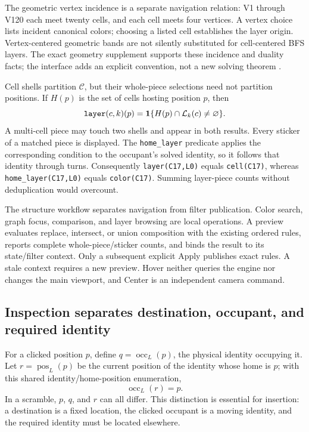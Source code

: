 \documentclass[a4paper,11pt]{article}
\begin{document}
The geometric vertex incidence is a separate navigation relation: V1 through V120 each meet twenty cells, and each cell meets four vertices. A vertex choice lists incident canonical colors; choosing a listed cell establishes the layer origin. Vertex-centered geometric bands are not silently substituted for cell-centered BFS layers. The exact geometry supplement supports these incidence and duality facts; the interface adds an explicit convention, not a new solving theorem \cite{puzzletheory,structure03}.

Cell shells partition \(\mathcal C\), but their whole-piece selections need not partition positions. If \(H(p)\) is the set of cells hosting position \(p\), then
\[
\texttt{layer}(c,k)(p)=
{\bf1}\{H(p)\cap\mathcal L_k(c)\ne\varnothing\}.
\]
A multi-cell piece may touch two shells and appear in both results. Every sticker of a matched piece is displayed. The \texttt{home\_layer} predicate applies the corresponding condition to the occupant's solved identity, so it follows that identity through turns. Consequently \texttt{layer(C17,L0)} equals \texttt{cell(C17)}, whereas \texttt{home\_layer(C17,L0)} equals \texttt{color(C17)}. Summing layer-piece counts without deduplication would overcount.

The structure workflow separates navigation from filter publication. Color search, graph focus, comparison, and layer browsing are local operations. A preview evaluates replace, intersect, or union composition with the existing ordered rules, reports complete whole-piece/sticker counts, and binds the result to its state/filter context. Only a subsequent explicit Apply publishes exact rules. A stale context requires a new preview. Hover neither queries the engine nor changes the main viewport, and Center is an independent camera command.

\subsection{Inspection separates destination, occupant, and required identity}

For a clicked position \(p\), define \(q=\operatorname{occ}_L(p)\), the physical identity occupying it. Let \(r=\operatorname{pos}_L(p)\) be the current position of the identity whose home is \(p\); with this shared identity/home-position enumeration,
\[
\operatorname{occ}_L(r)=p.
\]
In a scramble, \(p\), \(q\), and \(r\) can all differ. This distinction is essential for insertion: a destination is a fixed location, the clicked occupant is a moving identity, and the required identity must be located elsewhere.
\end{document}
